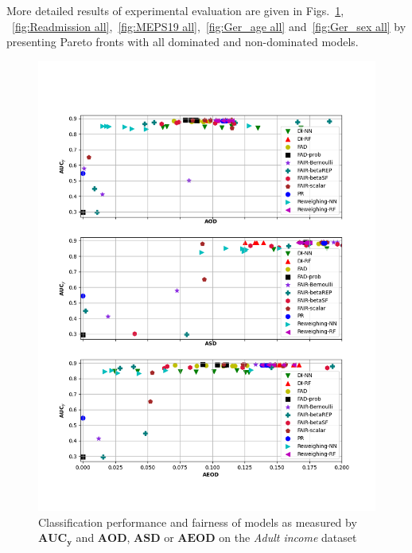 \documentclass[preprint,12pt]{elsarticle}
\begin{document}
More detailed results of experimental evaluation are given in Figs.~\ref{fig:Adult all}, ~\ref{fig:Readmission all},~\ref{fig:MEPS19 all},~\ref{fig:Ger_age all} and~\ref{fig:Ger_sex all} by presenting Pareto fronts with all dominated and non-dominated models.

\begin{figure}
	\center
	\includegraphics[angle=0, width=1\textwidth]{Adult_all.png}
	\captionsetup{justification=centering}
	\caption{Classification performance and fairness of models as measured by $\mathbf{AUC_y}$ and $\mathbf{AOD}$, $\mathbf{ASD}$ or $\mathbf{AEOD}$ on the \textit{Adult income} dataset}
	\label{fig:Adult all}
	\vskip -0.2in
\end{figure}
\end{document}
